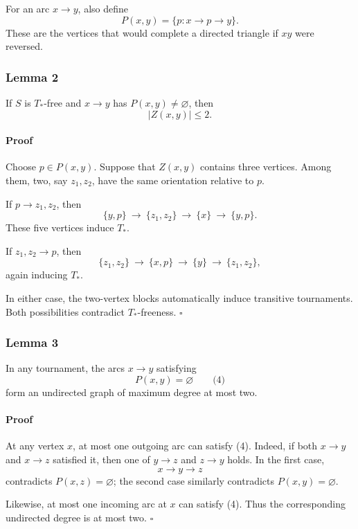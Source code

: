 \documentclass[
  11pt,
  a4paper,
]{article}
\begin{document}
For an arc \(x\to y\), also define \[
P(x,y)=\{p:x\to p\to y\}.
\] These are the vertices that would complete a directed triangle if
\(xy\) were reversed.

\subsubsection{Lemma 2}\label{lemma-2}

If \(S\) is \(T_\ast\)-free and \(x\to y\) has \(P(x,y)\ne\varnothing\),
then \[
|Z(x,y)|\le 2.
\]

\paragraph{Proof}\label{proof-1}

Choose \(p\in P(x,y)\). Suppose that \(Z(x,y)\) contains three vertices.
Among them, two, say \(z_1,z_2\), have the same orientation relative to
\(p\).

If \(p\to z_1,z_2\), then \[
\{y,p\}\ \longrightarrow\ \{z_1,z_2\}\
\longrightarrow\ \{x\}\ \longrightarrow\ \{y,p\}.
\] These five vertices induce \(T_\ast\).

If \(z_1,z_2\to p\), then \[
\{z_1,z_2\}\ \longrightarrow\ \{x,p\}\
\longrightarrow\ \{y\}\ \longrightarrow\ \{z_1,z_2\},
\] again inducing \(T_\ast\).

In either case, the two-vertex blocks automatically induce transitive
tournaments. Both possibilities contradict \(T_\ast\)-freeness.
\(\square\)

\subsubsection{Lemma 3}\label{lemma-3}

In any tournament, the arcs \(x\to y\) satisfying \[
P(x,y)=\varnothing
\qquad\text{(4)}
\] form an undirected graph of maximum degree at most two.

\paragraph{Proof}\label{proof-2}

At any vertex \(x\), at most one outgoing arc can satisfy (4). Indeed,
if both \(x\to y\) and \(x\to z\) satisfied it, then one of \(y\to z\)
and \(z\to y\) holds. In the first case, \[
x\to y\to z
\] contradicts \(P(x,z)=\varnothing\); the second case similarly
contradicts \(P(x,y)=\varnothing\).

Likewise, at most one incoming arc at \(x\) can satisfy (4). Thus the
corresponding undirected degree is at most two. \(\square\)
\end{document}

